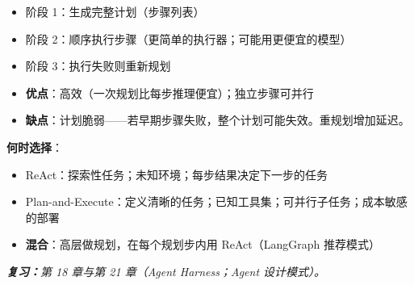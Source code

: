 \begin{questionbox}
\begin{itemize}
  \item 阶段 1：生成完整计划（步骤列表）
  \item 阶段 2：顺序执行步骤（更简单的执行器；可能用更便宜的模型）
  \item 阶段 3：执行失败则重新规划
  \item \textbf{优点}：高效（一次规划比每步推理便宜）；独立步骤可并行
  \item \textbf{缺点}：计划脆弱——若早期步骤失败，整个计划可能失效。重规划增加延迟。
\end{itemize}

\textbf{何时选择}：

\begin{itemize}
  \item ReAct：探索性任务；未知环境；每步结果决定下一步的任务
  \item Plan-and-Execute：定义清晰的任务；已知工具集；可并行子任务；成本敏感的部署
  \item \textbf{混合}：高层做规划，在每个规划步内用 ReAct（LangGraph 推荐模式）
\end{itemize}

\emph{\textbf{复习：}第 18 章与第 21 章（Agent Harness；Agent 设计模式）。}
\end{questionbox}

